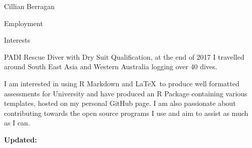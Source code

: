 \documentclass{scrartcl}
\begin{document}
\begin{cv}{Cillian Berragan}
\begin{cvlist}{Employment}
\end{cvlist}


\begin{cvlist}{Interests}
\item[]
PADI Rescue Diver with Dry Suit Qualification, at the end of 2017 I travelled around South East Asia and Western Australia logging over 40 dives.

I am interested in using R Markdown and \LaTeX\ to produce well formatted assessments for University and have produced an R Package containing various templates, hosted on my personal GitHub page. I am also passionate about contributing towards the open source programs I use and aim to assist as much as I can.


\end{cvlist}

\vfill

\small \textbf{Updated:} \end{cv}
\end{document}
